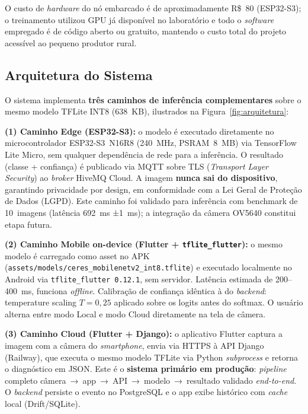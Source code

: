 \documentclass[12pt]{article}
\begin{document}
O custo de \textit{hardware} do nó embarcado é de aproximadamente R\$~80 (ESP32-S3);
o treinamento utilizou GPU já disponível no laboratório e todo o \textit{software}
empregado é de código aberto ou gratuito, mantendo o custo total do projeto acessível
ao pequeno produtor rural.

\subsection{Arquitetura do Sistema}

O sistema implementa \textbf{três caminhos de inferência complementares} sobre o
mesmo modelo TFLite INT8 (638~KB), ilustrados na Figura~\ref{fig:arquitetura}:

\textbf{(1) Caminho Edge (ESP32-S3):} o modelo é executado diretamente no
microcontrolador ESP32-S3~N16R8 (240~MHz, PSRAM~8~MB) via TensorFlow Lite Micro,
sem qualquer dependência de rede para a inferência. O resultado (classe + confiança)
é publicado via MQTT sobre TLS (\textit{Transport Layer Security}) ao \textit{broker}
HiveMQ Cloud. A imagem \textbf{nunca sai do dispositivo}, garantindo privacidade por
design, em conformidade com a Lei Geral de Proteção de Dados (LGPD). Este caminho
foi validado
para inferência com benchmark de 10~imagens (latência 692~ms ±1~ms); a integração
da câmera OV5640 constitui etapa futura.

\textbf{(2) Caminho Mobile on-device (Flutter + \texttt{tflite\_flutter}):} o mesmo
modelo é carregado como asset no APK (\texttt{assets/models/ceres\_mobilenetv2\_int8.tflite})
e executado localmente no Android via \texttt{tflite\_flutter~0.12.1}, sem servidor.
Latência estimada de 200--400~ms, funciona \textit{offline}. Calibração de confiança
idêntica à do \textit{backend}: temperature scaling $T=0{,}25$ aplicado sobre os
logits antes do softmax.
O usuário alterna entre modo Local e modo Cloud diretamente na tela de câmera.

\textbf{(3) Caminho Cloud (Flutter + Django):} o aplicativo Flutter captura a
imagem com a câmera do \textit{smartphone}, envia via HTTPS à API Django (Railway),
que executa o mesmo modelo TFLite via Python \textit{subprocess} e retorna o
diagnóstico em JSON.
Este é o \textbf{sistema primário em produção}: \textit{pipeline} completo câmera~→~app~→~API~→~modelo~→~resultado validado \textit{end-to-end}. O \textit{backend} persiste o evento no
PostgreSQL e o app exibe histórico com \textit{cache} local (Drift/SQLite).
\end{document}
